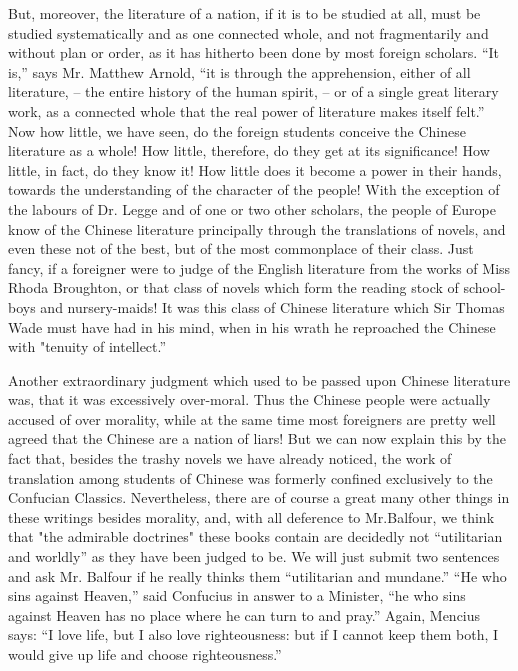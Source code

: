 But, moreover, the literature of a nation, if it is to be studied at all,
must be studied systematically and as one connected whole,
and not fragmentarily and without plan or order,
as it has hitherto been done by most foreign scholars.
``It is,'' says Mr. Matthew Arnold,
``it is through the apprehension, either of all literature,
-- the entire history of the human spirit,
-- or of a single great literary work, as a connected whole that the real power of literature makes itself felt.''
Now how little, we have seen, do the foreign students conceive the Chinese literature as a whole!
How little, therefore, do they get at its significance!
How little, in fact, do they know it!
How little does it become a power in their hands,
towards the understanding of the character of the people!
With the exception of the labours of Dr. Legge and of one or two other scholars,
the people of Europe know of the Chinese literature principally through the translations of novels, and even these not
of the best, but of the most commonplace of their class.
Just fancy, if a foreigner were to judge of the English literature from the works of Miss Rhoda Broughton,
or that class of novels which form the reading stock of school-boys and nursery-maids!
It was this class of Chinese literature which Sir Thomas Wade must have had in his mind,
when in his wrath he reproached the Chinese with "tenuity of intellect.''

Another extraordinary judgment which used to be passed upon Chinese literature was,
that it was excessively over-moral.
Thus the Chinese people were actually accused of over morality,
while at the same time most foreigners are pretty well agreed that the Chinese are a nation of liars!
But we can now explain this by the fact that,
besides the trashy novels we have already noticed,
the work of translation among students of Chinese was formerly confined exclusively to the Confucian Classics.
Nevertheless, there are of course a great many other things in these writings besides morality,
and, with all deference to Mr.Balfour,
we think that "the admirable doctrines" these books contain are decidedly not
``utilitarian and worldly'' as they have been judged to be.
We will just submit two sentences and ask Mr. Balfour
if he really thinks them ``utilitarian and mundane.''
``He who sins against Heaven,'' said Confucius in answer to a Minister,
``he who sins against Heaven has no place where he can turn to and pray.''
Again, Mencius says: ``I love life, but I also love righteousness:
but if I cannot keep them both, I would give up life and choose righteousness.''

